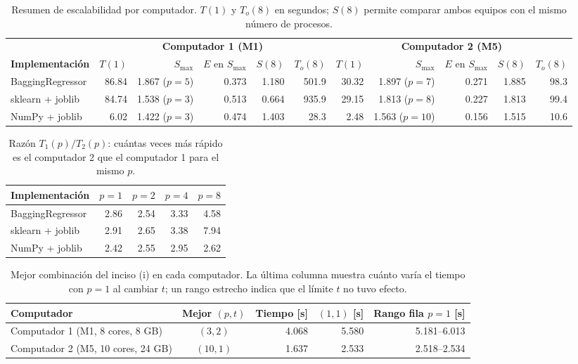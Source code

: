 \begin{table}[h]
    \centering
    \scriptsize
    \begin{tabular}{|l|rrrrr|rrrrr|}
    \hline
     & \multicolumn{5}{c|}{\textbf{Computador 1 (M1)}} & \multicolumn{5}{c|}{\textbf{Computador 2 (M5)}} \\
    \textbf{Implementación} & $T(1)$ & $S_{\max}$ & $E$ en $S_{\max}$ & $S(8)$ & $T_o(8)$ & $T(1)$ & $S_{\max}$ & $E$ en $S_{\max}$ & $S(8)$ & $T_o(8)$ \\
    \hline
    BaggingRegressor & 86.84 & 1.867 ($p=5$) & 0.373 & 1.180 & 501.9 & 30.32 & 1.897 ($p=7$) & 0.271 & 1.885 & 98.3 \\
    sklearn + joblib & 84.74 & 1.538 ($p=3$) & 0.513 & 0.664 & 935.9 & 29.15 & 1.813 ($p=8$) & 0.227 & 1.813 & 99.4 \\
    NumPy + joblib & 6.02 & 1.422 ($p=3$) & 0.474 & 1.403 & 28.3 & 2.48 & 1.563 ($p=10$) & 0.156 & 1.515 & 10.6 \\
    \hline
    \end{tabular}
    \caption{Resumen de escalabilidad por computador. $T(1)$ y $T_o(8)$ en segundos; $S(8)$ permite comparar ambos equipos con el mismo número de procesos.}
    \label{tab:resumen-j}
\end{table}

\begin{table}[h]
    \centering
    \small
    \begin{tabular}{|l|r|r|r|r|}
    \hline
    \textbf{Implementación} & $p=1$ & $p=2$ & $p=4$ & $p=8$ \\
    \hline
    BaggingRegressor & 2.86 & 2.54 & 3.33 & 4.58 \\
    sklearn + joblib & 2.91 & 2.65 & 3.38 & 7.94 \\
    NumPy + joblib & 2.42 & 2.55 & 2.95 & 2.62 \\
    \hline
    \end{tabular}
    \caption{Razón $T_1(p)/T_2(p)$: cuántas veces más rápido es el computador 2 que el computador 1 para el mismo $p$.}
    \label{tab:razon-j}
\end{table}

\begin{table}[h]
    \centering
    \small
    \begin{tabular}{|l|c|r|r|r|}
    \hline
    \textbf{Computador} & \textbf{Mejor $(p,t)$} & \textbf{Tiempo [s]} & \textbf{$(1,1)$ [s]} & \textbf{Rango fila $p=1$ [s]} \\
    \hline
    Computador 1 (M1, 8 cores, 8 GB) & $(3,2)$ & 4.068 & 5.580 & 5.181--6.013 \\
    Computador 2 (M5, 10 cores, 24 GB) & $(10,1)$ & 1.637 & 2.533 & 2.518--2.534 \\
    \hline
    \end{tabular}
    \caption{Mejor combinación del inciso (i) en cada computador. La última columna muestra cuánto varía el tiempo con $p=1$ al cambiar $t$; un rango estrecho indica que el límite $t$ no tuvo efecto.}
    \label{tab:pt-j}
\end{table}
